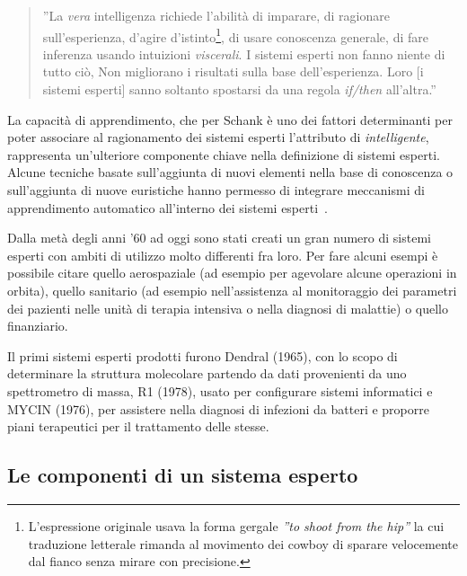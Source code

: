 \begin{quotation}
''La \emph{vera} intelligenza richiede l'abilità di imparare, di ragionare sull'esperienza, d'agire d'istinto\footnote{L'espressione originale usava la forma gergale \emph{''to shoot from the hip''} la cui traduzione letterale rimanda al movimento dei cowboy di sparare velocemente dal fianco senza mirare con precisione.}, di usare conoscenza generale, di fare inferenza usando intuizioni \emph{viscerali}. I sistemi esperti non fanno niente di tutto ciò, Non migliorano i risultati sulla base dell'esperienza. Loro [i sistemi esperti] sanno soltanto spostarsi da una regola \emph{if/then} all'altra.'' \cite{schank1984ia} 
\end{quotation}

La capacità di apprendimento, che per Schank \cite{schank1984ia} è uno dei fattori determinanti per poter associare al ragionamento dei sistemi esperti l'attributo di \emph{intelligente}, rappresenta un'ulteriore componente chiave nella definizione di sistemi esperti. Alcune tecniche basate sull'aggiunta di nuovi elementi nella base di conoscenza o sull'aggiunta di nuove euristiche hanno permesso di integrare meccanismi di apprendimento automatico all'interno dei sistemi esperti~\cite{nasa1988flops}.

Dalla metà degli anni '60 ad oggi  sono stati creati un gran numero di sistemi esperti con ambiti di utilizzo molto differenti fra loro. Per fare alcuni esempi è possibile citare quello aerospaziale (ad esempio per agevolare alcune operazioni in orbita), quello sanitario (ad esempio nell'assistenza al monitoraggio dei parametri dei pazienti nelle unità di terapia intensiva o nella diagnosi di malattie) o quello finanziario.~\cite{jackson1999}

Il primi sistemi esperti prodotti furono Dendral (1965), con lo scopo di determinare la struttura molecolare partendo da dati provenienti da uno spettrometro di massa, R1 (1978), usato per configurare sistemi informatici e MYCIN (1976), per assistere nella diagnosi di infezioni da batteri e proporre piani terapeutici per il trattamento delle stesse.

\subsection{Le componenti di un sistema esperto} 

